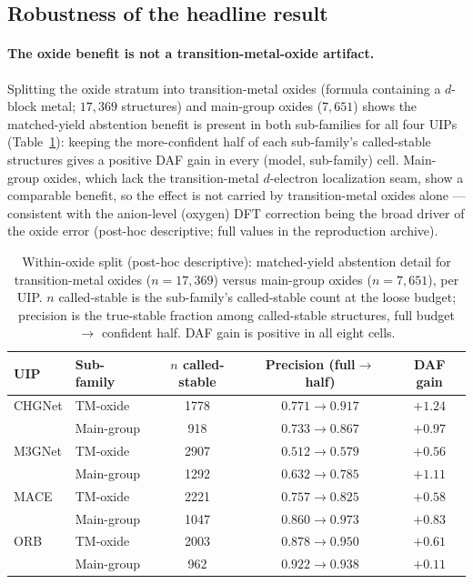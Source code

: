 \documentclass[aip,jcp,preprint,superscriptaddress,amsmath,amssymb]{revtex4-2}
\begin{document}
\subsection{Robustness of the headline result}

\paragraph{The oxide benefit is not a transition-metal-oxide artifact.} Splitting the oxide
stratum into transition-metal oxides (formula containing a $d$-block metal; $17{,}369$ structures)
and main-group oxides ($7{,}651$) shows the matched-yield abstention benefit is present in
both sub-families for all four UIPs (Table~\ref{tab:tmoxide}): keeping the more-confident
half of each sub-family's called-stable structures gives a positive DAF gain in every
(model, sub-family) cell. Main-group oxides, which lack the transition-metal $d$-electron
localization seam, show a comparable benefit, so the effect is not carried by transition-metal
oxides alone --- consistent with the anion-level (oxygen) DFT correction being the broad driver of
the oxide error (post-hoc descriptive; full values in the reproduction archive).

\begin{table}[t]
  \centering
  \caption{Within-oxide split (post-hoc descriptive): matched-yield abstention detail for
  transition-metal oxides ($n=17{,}369$) versus main-group oxides ($n=7{,}651$), per UIP.
  $n$ called-stable is the sub-family's called-stable count at the loose budget; precision is
  the true-stable fraction among called-stable structures, full budget $\to$ confident half.
  DAF gain is positive in all eight cells.}
  \label{tab:tmoxide}
  \begin{tabular}{llccc}
    \toprule
    UIP & Sub-family & $n$ called-stable & Precision (full$\to$half) & DAF gain \\
    \midrule
    CHGNet & TM-oxide    & 1778 & $0.771\to0.917$ & $+1.24$ \\
           & Main-group  & 918  & $0.733\to0.867$ & $+0.97$ \\
    M3GNet & TM-oxide    & 2907 & $0.512\to0.579$ & $+0.56$ \\
           & Main-group  & 1292 & $0.632\to0.785$ & $+1.11$ \\
    MACE   & TM-oxide    & 2221 & $0.757\to0.825$ & $+0.58$ \\
           & Main-group  & 1047 & $0.860\to0.973$ & $+0.83$ \\
    ORB    & TM-oxide    & 2003 & $0.878\to0.950$ & $+0.61$ \\
           & Main-group  & 962  & $0.922\to0.938$ & $+0.11$ \\
    \bottomrule
  \end{tabular}
\end{table}
\end{document}
